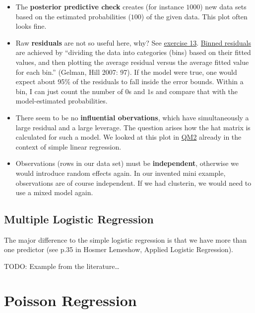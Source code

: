 \documentclass[
]{book}
\providecommand{\tightlist}{%
  \setlength{\itemsep}{0pt}\setlength{\parskip}{0pt}}
\begin{document}
\begin{itemize}
\tightlist
\item
  The \textbf{posterior predictive check} creates (for instance \(1000\)) new data sets
  based on the estimated probabilities (\(100\)) of the given data.
  This plot often looks fine.
\item
  Raw \textbf{residuals} are not so useful here, why? See \hyperref[exercise13_LMM]{exercise 13}.
  \href{https://easystats.github.io/performance/reference/binned_residuals.html}{Binned residuals}
  are achieved by ``dividing the data into categories (bins) based on
  their fitted values, and then plotting the average residual versus the
  average fitted value for each bin.'' (Gelman, Hill 2007: 97). If the
  model were true, one would expect about 95\% of the residuals to
  fall inside the error bounds.
  Within a bin, I can just count the number of \(0\)s and \(1\)s and
  compare that with the model-estimated probabilities.
\item
  There seem to be no \textbf{influential obervations}, which have simultaneously a large
  residual and a large leverage. The question arises how the hat matrix
  is calculated for such a model.
  We looked at this plot in \href{https://jdegenfellner.github.io/Script_QM2_ZHAW/simple-linear-regression.html\#influential-observations-middle-right}{QM2}
  already in the context of simple linear regression.
\item
  Observations (rows in our data set) must be \textbf{independent}, otherwise we would introduce random effects again.
  In our invented mini example, observations are of course independent.
  If we had clusterin, we would need to use a mixed model again.
\end{itemize}

\subsection{Multiple Logistic Regression}\label{multiple_logistic_regression}

The major difference to the simple logistic regression is that we have more
than one predictor (see p.35 in Hosmer Lemeshow, Applied Logistic Regression).

TODO: Example from the literature\ldots{}

\section{Poisson Regression}\label{poisson-regression}
\end{document}
